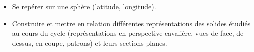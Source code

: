 \begin{prerequis}[Objectifs de 3\up{e}]    
    \begin{itemize}        
        \item Se repérer sur une sphère (latitude, longitude).
        \columnbreak
        \item Construire et mettre en relation différentes représentations des solides étudiés au cours du cycle (représentations en perspective cavalière, vues de face, de dessus, en coupe, patrons) et leurs sections planes.
    \end{itemize}
\end{prerequis}